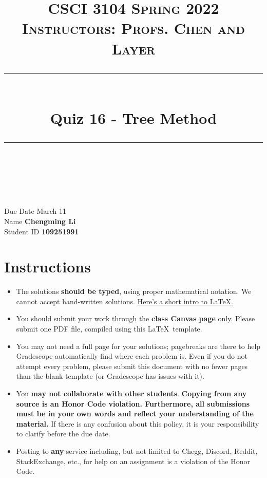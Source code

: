 \documentclass[11pt]{article}
\title{
\normalfont \normalsize 
\textsc{CSCI 3104 Spring 2022 \\ 
Instructors: Profs. Chen and Layer} \\
[10pt] 
\rule{\linewidth}{0.5pt} \\[6pt] 
\huge Quiz 16 - Tree Method \\
\rule{\linewidth}{2pt}  \\[10pt]
}
\date{}
\theoremstyle{definition}
\theoremstyle{definition}
\theoremstyle{definition}
\begin{document}

\maketitle


\noindent
Due Date \dotfill March 11 \\
Name \dotfill \textbf{Chengming Li} \\
Student ID \dotfill \textbf{109251991} \\


\tableofcontents

\section{Instructions}
 \begin{itemize}
	\item The solutions \textbf{should be typed}, using proper mathematical notation. We cannot accept hand-written solutions. \href{http://ece.uprm.edu/~caceros/latex/introduction.pdf}{Here's a short intro to \LaTeX.}
	\item You should submit your work through the \textbf{class Canvas page} only. Please submit one PDF file, compiled using this \LaTeX \ template.
	\item You may not need a full page for your solutions; pagebreaks are there to help Gradescope automatically find where each problem is. Even if you do not attempt every problem, please submit this document with no fewer pages than the blank template (or Gradescope has issues with it).

	\item You \textbf{may not collaborate with other students}. \textbf{Copying from any source is an Honor Code violation. Furthermore, all submissions must be in your own words and reflect your understanding of the material.} If there is any confusion about this policy, it is your responsibility to clarify before the due date. 

	\item Posting to \textbf{any} service including, but not limited to Chegg, Discord, Reddit, StackExchange, etc., for help on an assignment is a violation of the Honor Code.

\end{itemize}
\end{document}
